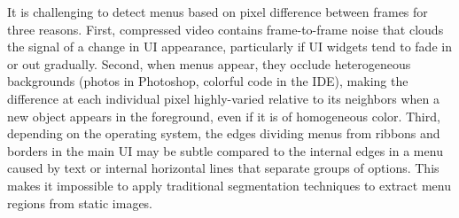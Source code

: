 \documentclass[10pt]{article}
\begin{document}
It is challenging to detect menus based on pixel difference between frames for three reasons.  First, compressed 
video contains frame-to-frame noise that clouds the signal of a change in UI appearance, 
particularly if UI widgets tend to fade in or out gradually.  Second, when menus appear, they occlude
heterogeneous backgrounds (photos in Photoshop, colorful code in the IDE), making the difference
at each individual pixel highly-varied relative to its neighbors when a new object appears in the
foreground, even if it is of homogeneous color.  Third, depending on the operating system, 
the edges dividing menus from ribbons and borders in the main UI may be subtle compared to the
internal edges in a menu caused by text or internal horizontal lines that separate groups of options.
This makes it impossible to apply traditional segmentation techniques to extract menu regions from 
static images.
\end{document}
